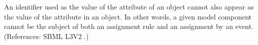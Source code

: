 An identifier used as the value of the attribute  of an
\EventAssignment object cannot also appear as the value of the
 attribute in an \AssignmentRule object.  In other words, a
given model component cannot be the subject of both an assignment rule and
an assignment by an event.  (References: SBML L3V2
.)
